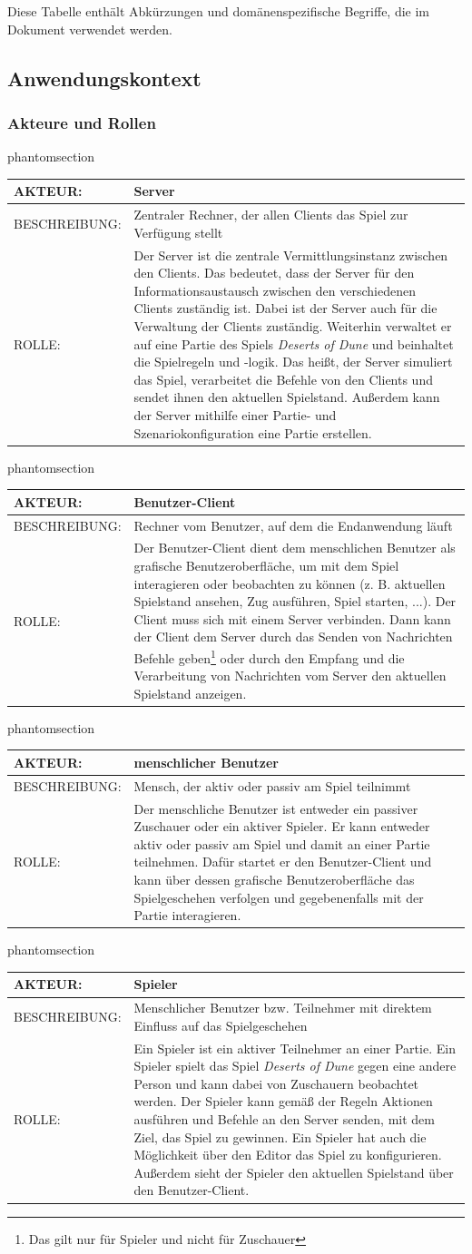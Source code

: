 \documentclass[12pt]{article}
\makeatletter
\newcommand{\labeltext}[2]{%
  \@bsphack
  \csname phantomsection\endcsname %
  \def\@currentlabel{#1}{\label{#2}}%
  \@esphack
}
\newcounter{fa}
\newcounter{nfa}
\newcommand{\akteur}[4]{
\labeltext{#2}{#1}
\begin{tabularx}{16cm}{|l|X|}
\hline 
AKTEUR: & #2 \\
\hline
BESCHREIBUNG: & #3 \\
\hline
ROLLE: & #4 \\ 
\hline
\end{tabularx}
}
\makeatother
\begin{document}
Diese Tabelle enthält Abkürzungen und domänenspezifische Begriffe, die im Dokument verwendet
werden.

\subsection{Anwendungskontext}
\subsubsection{Akteure und Rollen}

\akteur{A-Server}{Server}{Zentraler Rechner, der allen Clients das Spiel zur Verfügung stellt}{Der Server ist die zentrale Vermittlungsinstanz zwischen den Clients. Das bedeutet, dass der Server für den Informationsaustausch zwischen den verschiedenen Clients zuständig ist. Dabei ist der Server auch für die Verwaltung der Clients zuständig. Weiterhin verwaltet er auf eine Partie des Spiels \textit{Deserts of Dune} und beinhaltet die Spielregeln und -logik. Das heißt, der Server simuliert das Spiel, verarbeitet die Befehle von den Clients und sendet ihnen den aktuellen Spielstand. Außerdem kann der Server mithilfe einer Partie- und Szenariokonfiguration eine Partie erstellen.}

\akteur{A-Benutzer-Client}{Benutzer-Client}{Rechner vom Benutzer, auf dem die Endanwendung läuft}{Der Benutzer-Client dient dem menschlichen Benutzer als grafische Benutzeroberfläche, um mit dem Spiel interagieren oder beobachten zu können (z. B. aktuellen Spielstand ansehen, Zug ausführen, Spiel starten, ...). Der Client muss sich mit einem Server verbinden. Dann kann der Client dem Server durch das Senden von Nachrichten Befehle geben\footnote{Das gilt nur für Spieler und nicht für Zuschauer} oder durch den Empfang und die Verarbeitung von Nachrichten vom Server den aktuellen Spielstand anzeigen.}

\akteur{A-Benutzer}{menschlicher Benutzer}{Mensch, der aktiv oder passiv am Spiel teilnimmt}{Der menschliche Benutzer ist entweder ein passiver Zuschauer oder ein aktiver Spieler. Er kann entweder aktiv oder passiv am Spiel und damit an einer Partie teilnehmen. Dafür startet er den Benutzer-Client und kann über dessen grafische Benutzeroberfläche das Spielgeschehen verfolgen und gegebenenfalls mit der Partie interagieren.}

\akteur{A-Spieler}{Spieler}{Menschlicher Benutzer bzw. Teilnehmer mit direktem Einfluss auf das Spielgeschehen}{Ein Spieler ist ein aktiver Teilnehmer an einer Partie. Ein Spieler spielt das Spiel \textit{Deserts of Dune} gegen eine andere Person und kann dabei von Zuschauern beobachtet werden. Der Spieler kann gemäß der Regeln Aktionen ausführen und Befehle an den Server senden, mit dem Ziel, das Spiel zu gewinnen. Ein Spieler hat auch die Möglichkeit über den Editor das Spiel zu konfigurieren. Außerdem sieht der Spieler den aktuellen Spielstand über den Benutzer-Client.}
\end{document}
